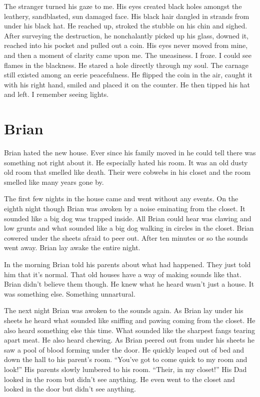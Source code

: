 The stranger turned his gaze to me. His eyes created black holes
amongst the leathery, sandblasted, sun damaged face. His black hair
dangled in strands from under his black hat. He reached up, stroked
the stubble on his chin and sighed. After surveying the
destruction, he nonchalantly picked up his glass, downed it,
reached into his pocket and pulled out a coin. His eyes never moved
from mine, and then a moment of clarity came upon me. The
uneasiness. I froze. I could see flames in the blackness. He stared
a hole directly through my soul. The carnage still existed among an
eerie peacefulness. He flipped the coin in the air, caught it with
his right hand, smiled and placed it on the counter. He then tipped
his hat and left. I remember seeing lights. 

 



\chapter{Brian}



Brian hated the new house. Ever since his family moved in he could tell
there was something not right about it. He especially hated his room. It
was an old dusty old room that smelled like death. Their were cobwebs in
his closet and the room smelled like many years gone by.



The first few nights in the house came and went without any events.
On the eighth night though Brian was awoken by a noise eminating
from the closet. It sounded like a big dog was trapped inside. All
Brian could hear was clawing and low grunts and what sounded like a
big dog walking in circles in the closet. Brian cowered under the
sheets afraid to peer out. After ten minutes or so the sounds went
away. Brian lay awake the entire night.



In the morning Brian told his parents about what had happened. They
just told him that it's normal. That old houses have a way of
making sounds like that. Brian didn't believe them though. He knew
what he heard wasn't just a house. It was something else. Something
unnartural.



The next night Brian was awoken to the sounds again. As Brian lay
under his sheets he heard what sounded like sniffing and pawing
coming from the closet. He also heard something else this time.
What sounded like the sharpest fangs tearing apart meat. He also
heard chewing. As Brian peered out from under his sheets he saw a
pool of blood forming under the door. He quickly leaped out of bed
and down the hall to his parent's room. ``You've got to come quick
to my room and look!'' His parents slowly lumbered to his room.
``Their, in my closet!'' His Dad looked in the room but didn't see
anything. He even went to the closet and looked in the door but
didn't see anything.



